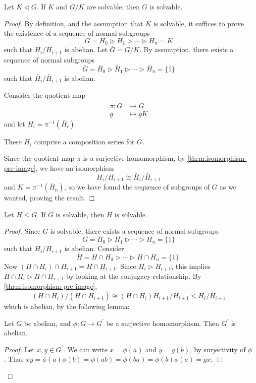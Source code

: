 \begin{proposition}\label{prop:solvable-group-quotient}
Let $K\triangleleft G$. If $K$ and $G/K$ are solvable, then $G$ is solvable. 
\end{proposition}

\begin{proof}
By definition, and the assumption that $K$ is solvable, it suffices to prove the existence of a sequence of normal subgroups
\[G=H_0\triangleright H_1\triangleright\cdots\triangleright H_n=K\]
such that $H_i/H_{i+1}$ is abelian. Let $\bar{G}=G/K$. By assumption, there exists a sequence of normal subgroups
\[\bar{G}=\bar{H}_0\triangleright\bar{H}_1\triangleright\cdots\triangleright\bar{H}_n=\{\bar{1}\}\]
such that $\bar{H}_i/\bar{H}_{i+1}$ is abelian.

Consider the quotient map
\begin{align*}
\pi\colon G&\to\bar{G}\\
g&\mapsto gK
\end{align*}
and let $H_i=\pi^{-1}(\bar{H}_i)$.
\begin{claim}
These $H_i$ comprise a composition series for $G$.
\end{claim}
Since the quotient map $\pi$ is a surjective homomorphism, by \ref{thrm:isomorphism-pre-image}, we have an isomorphism
\[H_i/H_{i+1}\cong\bar{H}_i/\bar{H}_{i+1}\]
and $K=\pi^{-1}(\bar{H}_n)$, so we have found the sequence of subgroups of $G$ as we wanted, proving the result.
\end{proof}

\begin{proposition}
Let $H\le G$. If $G$ is solvable, then $H$ is solvable.
\end{proposition}

\begin{proof}
Since $G$ is solvable, there exists a sequence of normal subgroups
\[G=H_0\triangleright H_1\triangleright\cdots\triangleright H_n=\{1\}\]
such that $H_i/H_{i+1}$ is abelian.
Consider
\[H=H\cap H_0\triangleright\cdots\triangleright H\cap H_n=\{1\}.\]
Now $(H\cap H_i)\cap H_{i+1}=H\cap H_{i+1}$. 
Since $H_i\triangleright H_{i+1}$, this implies $H\cap H_i\triangleright H\cap H_{i+1}$ by looking at the conjugacy relationship. By \ref{thrm:isomorphism-pre-image},
\[(H\cap H_i)/(H\cap H_{i+1})\cong(H\cap H_i)H_{i+1}/H_{i+1}\le H_i/H_{i+1}\]
which is abelian, by the following lemma:

\begin{lemma*}
Let $G$ be abelian, and $\phi\colon G\to G^\prime$ be a surjective homomorphism. Then $G^\prime$ is abelian.
\end{lemma*} 

\begin{proof}
Let $x,y\in G^\prime$. We can write $x=\phi(a)$ and $y=g(b)$, by surjectivity of $\phi$. Thus $xy=\phi(a)\phi(b)=\phi(ab)=\phi(ba)=\phi(b)\phi(a)=yx$. 
\end{proof}
\end{proof}

